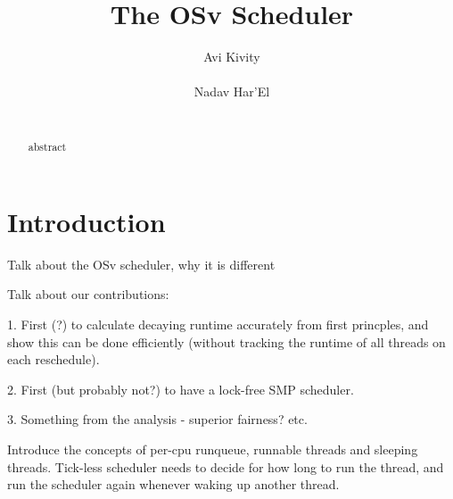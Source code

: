 \documentclass{sig-alternate}
\begin{document}
\title{The OSv Scheduler}
\author{
\alignauthor
Avi Kivity\\
   \\
\alignauthor
Nadav Har'El\\
   \\
}
\maketitle
\begin{abstract}
abstract
\end{abstract}


\section{Introduction}
Talk about the OSv scheduler, why it is different

Talk about our contributions:

1.  First (?) to calculate decaying runtime accurately from first princples,
and show this can be done efficiently (without tracking the runtime of all
threads on each reschedule).

2. First (but probably not?) to have a lock-free SMP scheduler.

3. Something from the analysis - superior fairness? etc.

Introduce the concepts of per-cpu runqueue, runnable threads and sleeping
threads.
Tick-less scheduler needs to decide for how long to run the thread,
and run the scheduler again whenever waking up another thread.

\end{document}
